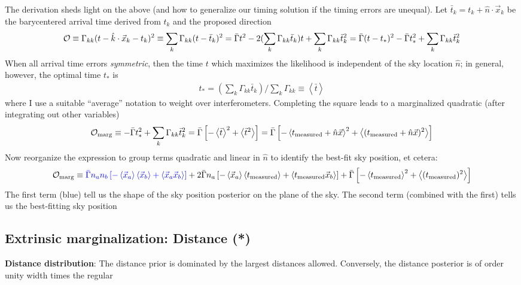 \documentclass[twocolumn,prd,nofootinbib]{revtex4}
\begin{document}
\begin{widetext}
\begin{shaded}
The derivation sheds light on the above (and how to generalize our timing solution if the timing errors are unequal).
Let $\bar{t}_k = t_k+\hat{n}\cdot \vec{x}_k$ be the barycentered arrival time derived from $t_k$ and the proposed direction
\begin{eqnarray}
{\cal O}\equiv \Gamma_{kk}(t-\hat{k}\cdot \vec{x}_k -t_k)^2 \equiv \sum_k\Gamma_{kk}(t-\bar{t}_k)^2 
= \bar{\Gamma} t^2 - 2 (\sum_k \Gamma_{kk} \bar{t}_k)t + \sum_k \Gamma_{kk}\bar{t}_k^2 
= \bar{\Gamma}(t-t_*)^2 - \bar{\Gamma} t_*^2  + \sum_k \Gamma_{kk}\bar{t}_k^2 
\end{eqnarray}
When all arrival time errors  \emph{symmetric}, then the time $t$ which maximizes the likelihood is  independent of the
sky location $\hat{n}$; in general, however, the optimal time $t_*$ is
\begin{eqnarray}
t_*  = (\sum_k \Gamma_{kk} \bar{t}_k)/\sum_k \Gamma_{kk} \equiv \left<\bar{t}\right>
\end{eqnarray}
where I use a suitable ``average'' notation to weight over interferometers. 
Completing the square leads to a marginalized quadratic (after integrating out other variables)
\begin{eqnarray}
{\cal O}_{\rm marg}\equiv - \bar{\Gamma} t_*^2  + \sum_k \Gamma_{kk}\bar{t}_k^2  
 = \bar{\Gamma}\left[ -\left<\bar{t}\right>^2 + \left<\bar{t}^2 \right> \right]
 = \bar{\Gamma}\left[ -\left<t_{\rm measured}+\hat{n}\vec{x}\right>^2 + \left<(t_{\rm measured}+\hat{n}\vec{x})^2
  \right>
 \right]
\end{eqnarray}
Now reorganize the expression to group terms quadratic and linear in $\hat{n}$ to identify the best-fit sky position, et
cetera:
\begin{eqnarray}
{\cal O}_{\rm marg} \equiv 
{\color{blue}\bar{\Gamma}n_a n_b \left[
   -\left<\vec{x}_a\right>\left<\vec{x}_b\right> + \left<\vec{x}_a \vec{x}_b\right>
 \right]
}
+{ 2 \bar{\Gamma}n_a  \left[
   -\left<\vec{x}_a \right>\left<t_{\rm measured}\right> + \left< t_{\rm measured} \vec{x}_b\right>
 \right]
}
+  \bar{\Gamma}  \left[
 -\left<t_{\rm measured}\right>^2 + \left<(t_{\rm measured})^2 \right>
 \right]
\end{eqnarray}
The first  term (blue) tell us the shape of the sky position posterior on the plane of the sky.  The second term
(combined with the first) tells us the best-fitting sky position
\end{shaded}

\subsection{Extrinsic marginalization: Distance (*)}

\noindent \textbf{Distance distribution}: The distance prior is dominated by the largest distances allowed.  Conversely,
the distance posterior is of order unity width times the regular

\end{widetext}
\end{document}
